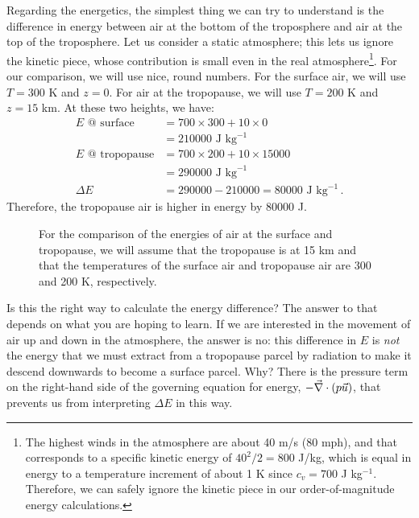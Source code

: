 \documentclass[12pt]{article}
\begin{document}
Regarding the energetics, the simplest thing we can try to understand is the difference in energy between air at the bottom of the troposphere and air at the top of the troposphere.  Let us consider a static atmosphere; this lets us ignore the kinetic piece, whose contribution is small even in the real atmosphere\footnote{The highest winds in the atmosphere are about 40 m/s (80 mph), and that corresponds to a specific kinetic energy of $40^2/2 = 800$ J/kg, which is equal in energy to a temperature increment of about 1 K since $c_v = 700$ J kg$^{-1}$.  Therefore, we can safely ignore the kinetic piece in our order-of-magnitude energy calculations.}.  For our comparison, we will use nice, round numbers.  For the surface air, we will use $T = 300$ K and $z = 0$.  For air at the tropopause, we will use $T = 200$ K and $z = 15$ km.  At these two heights, we have:
\begin{align}
E \text{ @ surface} &= 700 \times 300 + 10 \times 0 \\
&= \num{210000} \text{ J kg}^{-1} \\
E \text{ @ tropopause} &= 700 \times 200 + 10 \times 15000 \\
&= \num{290000} \text{ J kg}^{-1} \\
\Delta E &= \num{290000} - \num{210000} = \num{80000} \text{ J kg}^{-1} \, .
\end{align}
Therefore, the tropopause air is {\text higher} in energy by \num{80000} J.


\begin{figure}
\begin{center}
\end{center}
\caption{For the comparison of the energies of air at the surface and tropopause, we will assume that the tropopause is at 15 km and that the temperatures of the surface air and tropopause air are 300 and 200 K, respectively.}
\end{figure}


Is this the right way to calculate the energy difference?  The answer to that depends on what you are hoping to learn.  If we are interested in the movement of air up and down in the atmosphere, the answer is no: this difference in $E$ is {\it not} the energy that we must extract from a tropopause parcel by radiation to make it descend downwards to become a surface parcel.  Why?  There is the pressure term on the right-hand side of the governing equation for energy, $-{\vec{\nabla}} \cdot (p\vec{u})$, that prevents us from interpreting $\Delta E$ in this way.
\end{document}
